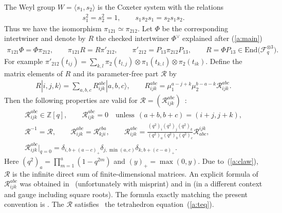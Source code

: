 The Weyl group $W=\langle s_1, s_2 \rangle$ is the Coxeter system
with the relations
\begin{gather*}
s_1^2=s_2^2=1,\qquad
s_1s_2s_1 = s_2s_1s_2.
\end{gather*}
Thus we have the isomorphism
$\pi_{121} \simeq \pi_{212}$.
Let $\Phi$ be the corresponding intertwiner and denote by $R$
the checked intertwiner $\Phi^\vee$ explained after (\ref{a:main})
\begin{gather*}
 \pi_{121} \Phi = \Phi  \pi_{212},\qquad
\pi_{121} R = R  \pi'_{212},
\qquad \pi'_{212} = P_{13}\pi_{212}P_{13},\qquad
 R = \Phi P_{13}\in \mathrm{End}\big(\mathcal{F}_q^{\otimes 3}\big).
\end{gather*}
For example
$\pi'_{212}(t_{ij}) = \sum_{k,l}
\pi_2(t_{l,j})\otimes \pi_1(t_{k,l})\otimes \pi_2(t_{ik})$.
Def\/ine the matrix elements of $R$ and its parameter-free part
$\mathscr{R}$ by
\begin{gather*}
R |i,j,k \rangle=
\sum_{a,b,c}R^{abc}_{ijk}|a,b,c \rangle,
\qquad
R^{abc}_{ijk}  = \mu_1^{a-j+k}\mu_2^{b-a-k}
\mathscr{R}^{abc}_{ijk}.
\end{gather*}
Then the following properties are valid for
$\mathscr{R} = (\mathscr{R}^{abc}_{ijk})$~\cite{KO1}:
\begin{gather}
 \mathscr{R}^{abc}_{ijk} \in \mathbb{Z}[q],\qquad
\mathscr{R}^{abc}_{ijk}=0 \quad \mathrm{unless}\ \ (a+b, b+c)=(i+j,j+k),
\label{a:claw}\\
 \mathscr{R}^{-1} = \mathscr{R},
\qquad\mathscr{R}^{abc}_{ijk} = \mathscr{R}^{cba}_{kji},\qquad
{\mathscr{R}}^{abc}_{ijk}
= \frac{(q^2)_i(q^2)_j(q^2)_k}{(q^2)_a(q^2)_b(q^2)_c}
{\mathscr{R}}^{ijk}_{abc},\label{a:rprop}\\
\mathscr{R}^{abc}_{ijk}|_{q=0} = \delta_{i, b+(a-c)_+}\delta_{j,\min(a,c)}
\delta_{k, b+(c-a)_+}.\label{a:r0}
\end{gather}
Here $(q^2)_a = \prod\limits_{m=1}^a(1-q^{2m})$
and $(y)_+ = \max(0,y)$.
Due to~(\ref{a:claw}), $\mathscr{R}$ is the inf\/inite direct sum
of f\/inite-dimensional matrices.
An explicit formula of $\mathscr{R}^{abc}_{ijk}$ was obtained in~\cite{KV} (unfortunately with misprint) and in
\cite[equation~(59)]{BMS} (in a dif\/ferent context and gauge including square roots).
The formula exactly matching the present convention is
\cite[equation~(2.20)]{KO1}.
The $\mathscr{R}$ satisf\/ies~\cite{KV}
the tetrahedron equation~(\ref{a:teq}).

